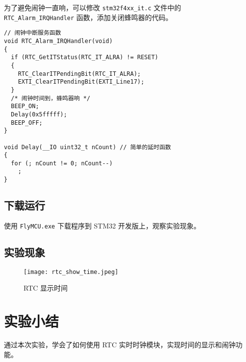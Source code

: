 \documentclass{math201}
\begin{document}
为了避免闹钟一直响，可以修改 \texttt{stm32f4xx\_it.c} 文件中的 \texttt{ RTC\_Alarm\_IRQHandler} 函数，添加关闭蜂鸣器的代码。

\begin{verbatim}
// 闹钟中断服务函数
void RTC_Alarm_IRQHandler(void)
{
  if (RTC_GetITStatus(RTC_IT_ALRA) != RESET)
  {
    RTC_ClearITPendingBit(RTC_IT_ALRA);
    EXTI_ClearITPendingBit(EXTI_Line17);
  }
  /* 闹钟时间到，蜂鸣器响 */
  BEEP_ON;
  Delay(0x5fffff);
  BEEP_OFF;
}

void Delay(__IO uint32_t nCount) // 简单的延时函数
{
  for (; nCount != 0; nCount--)
    ;
}
\end{verbatim}

\subsection{下载运行}

使用 \texttt{FlyMCU.exe} 下载程序到 STM32 开发版上，观察实验现象。

\subsection{实验现象}

\begin{figure}[H]
  \centering\texttt{[image: rtc\_show\_time.jpeg]}
  \caption{RTC 显示时间}
\end{figure}

\section{实验小结}

通过本次实验，学会了如何使用 RTC 实时时钟模块，实现时间的显示和闹钟功能。
\end{document}
